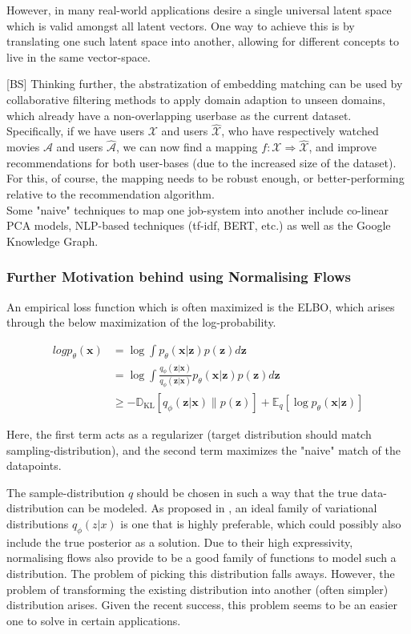 \documentclass{NSF}
\begin{document}
However, in many real-world applications desire a single universal latent space which is valid amongst all latent vectors.
One way to achieve this is by translating one such latent space into another, allowing for different concepts to live in the same vector-space.

[BS]
Thinking further, the abstratization of embedding matching can be used by collaborative filtering methods to apply domain adaption to unseen domains, which already have a non-overlapping userbase as the current dataset.
Specifically, if we have users $\mathcal{X}$ and users $\mathcal{\hat{X}}$, who have respectively watched movies $\mathcal{A}$ and users $\mathcal{\hat{A}}$, we can now find a mapping $f: \mathcal{X} \Longrightarrow \mathcal{\hat{X}}$, and improve recommendations for both user-bases (due to the increased size of the dataset).
For this, of course, the mapping needs to be robust enough, or better-performing relative to the recommendation algorithm. \\

Some "naive" techniques to map one job-system into another include co-linear PCA models, NLP-based techniques (tf-idf, BERT, etc.) as well as the Google Knowledge Graph.

\subsubsection{Further Motivation behind using Normalising Flows}

An empirical loss function which is often maximized is the ELBO, which arises through the below maximization of the log-probability.

\begin{align*}
    log p_{\theta}(\mathbf{x}) &= \log \int p_{\theta}(\mathbf{x} | \mathbf{z}) p(\mathbf{z}) d \mathbf{z} \\
&=\log \int \frac{q_{\phi}(\mathbf{z} | \mathbf{x})}{q_{\phi}(\mathbf{z} | \mathbf{x})} p_{\theta}(\mathbf{x} | \mathbf{z}) p(\mathbf{z}) d \mathbf{z} \\ &\geq-\mathbb{D}_{\mathrm{KL}}\left[q_{\phi}(\mathbf{z} | \mathbf{x}) \| p(\mathbf{z})\right]+\mathbb{E}_{q}\left[\log p_{\theta}(\mathbf{x} | \mathbf{z})\right]
\end{align*}

Here, the first term acts as a regularizer (target distribution should match sampling-distribution), and the second term maximizes the "naive" match of the datapoints.

The sample-distribution $q$ should be chosen in such a way that the true data-distribution can be modeled.
As proposed in \cite{variational_inference_using_normalized_flows}, an ideal family of variational distributions $q_\phi(z|x)$ is one that is highly preferable, which could possibly also include the true posterior as a solution.
Due to their high expressivity, normalising flows also provide to be a good family of functions to model such a distribution.
The problem of picking this distribution falls aways.
However, the problem of transforming the existing distribution into another (often simpler) distribution arises.
Given the recent success, this problem seems to be an easier one to solve in certain applications.
\end{document}
